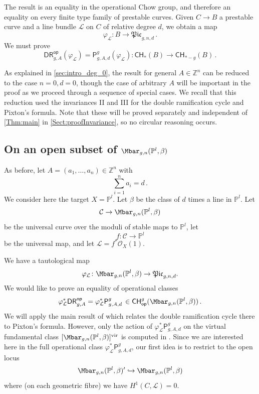 \documentclass[a4paper,12pt]{article} %
\newcommand{\bb}[1]{{\mathbb{#1}}}
\newcommand{\ca}[1]{{\mathcal{#1}}}
\def\P{\mathsf{P}}
\newcommand{\hra}{\hookrightarrow}
\theoremstyle{definition}
\theoremstyle{plain}%
\renewcommand{\phi}{\varphi}
\newcommand{\Picabs}{\mathfrak{Pic}}
\newcommand{\Chow}{\mathsf{CH}}
\newcommand{\invnrn}{II}
\newcommand{\invnrA}{III}
\newcommand{\DRop}{\mathsf{DR}^{\mathsf{op}}}
\begin{document}
The result is an equality in the operational Chow group, and therefore
an equality on every finite type family of prestable curves. Given $C\to B$ a prestable curve and a line bundle $\ca L$ on $C$ of relative degree $d$, we obtain
a map $$\phi_{\ca L}\colon B \to \Picabs_{g,n,d}\, .$$
We must prove 
\begin{equation}\label{eq:main_conj}
\DRop_{g,A}(\phi_{\ca L})= {\P_{g,A,d}^g}(\phi_{\ca L}) : \Chow_*(B) \to \Chow_{*-g}(B)\, .
\end{equation} 



As explained in \cref{sec:intro_deg_0},  the result for general $A \in \mathbb{Z}^n$ can be reduced  to the case $n=0, d=0$, though the case of arbitrary $A$ will be important in the proof as we proceed through a sequence of special cases. We recall that this reduction used the invariances \invnrn{} and \invnrA{} for the double ramification cycle and Pixton's formula. Note that these will be proved separately and independent of \cref{Thm:main} in \cref{Sect:proofInvariance}, so no circular reasoning occurs.  




\subsection{On an open subset of $\Mbar_{g,n}(\mathbb{P}^l,\beta)$}\label{sec:projective_target}


\newcommand{\kk}{l}
As before, let $A=(a_1,\ldots,a_n) \in \bb Z^n$ with $$\sum_{i=1}^n a_i=d\,.$$ 
We consider here the target $X = \bb P^\kk$.
Let $\beta$ be the class of $d$ times a line in $\bb P^\kk$. 
Let 
$$\ca C \to \Mbar_{g,n}(\mathbb{P}^l,\beta)$$
be the universal curve over the moduli of stable maps to $\mathbb{P}^l$, let 
$$f\colon \ca C \to \mathbb{P}^l$$ be the universal map, and 
let $\ca L = f^*\ca O_X(1)$.


We have a tautological map
\begin{equation}
\phi_{\ca L} \colon \Mbar_{g,n}(\mathbb{P}^l,\beta) \to \Picabs_{g,n,d}. 
\end{equation}
We would like to prove an equality of operational classes 
$$\phi_{\ca L}^*\DRop_{g,A}=\phi_{\ca L}^*{\P_{g,A,d}^g}\, \in \mathsf{CH}_{\mathsf{op}}^g(\Mbar_{g,n}(\mathbb{P}^l,\beta))\, .$$
We will apply  the main result of \cite{Janda2018Double-ramifica} which
relates the double ramification cycle there to 
Pixton's formula. However, 
only the action of $\phi_{\ca L}^*{\P_{g,A,d}^g}$ on the
virtual fundamental class
$[ \Mbar_{g,n}(\mathbb{P}^l,\beta)]^\textup{vir}$ is computed in \cite{Janda2018Double-ramifica}. 
Since we are interested here in the full operational class $\phi_{\ca L}^*{\P_{g,A,d}^g}$,
our first idea is to restrict to the open locus 
$$\Mbar_{g,n}(\mathbb{P}^l,\beta)' \hra \Mbar_{g,n}(\mathbb{P}^l,\beta)$$ 
where (on each geometric fibre) we have $H^1(C, \ca L) = 0$. 
\end{document}
